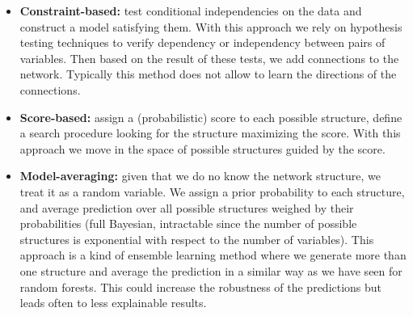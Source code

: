 \begin{itemize}
    \item \textbf{Constraint-based:} test conditional independencies on the data and construct a model satisfying them. With this approach we rely on hypothesis testing techniques to verify dependency or independency between pairs of variables. Then based on the result of these tests, we add connections to the network. Typically this method does not allow to learn the directions of the connections.
    
    \item \textbf{Score-based:} assign a (probabilistic) score to each possible structure, define a search procedure looking for the structure maximizing the score. With this approach we move in the space of possible structures guided by the score.
    
    \item \textbf{Model-averaging:} given that we do no know the network structure, we treat it as a random variable. We assign a prior probability to each structure, and average prediction over all possible structures weighed by their probabilities (full Bayesian, intractable since the number of possible structures is exponential with respect to the number of variables). This approach is a kind of ensemble learning method where we generate more than one structure and average the prediction in a similar way as we have seen for random forests. This could increase the robustness of the predictions but leads often to less explainable results.
\end{itemize}